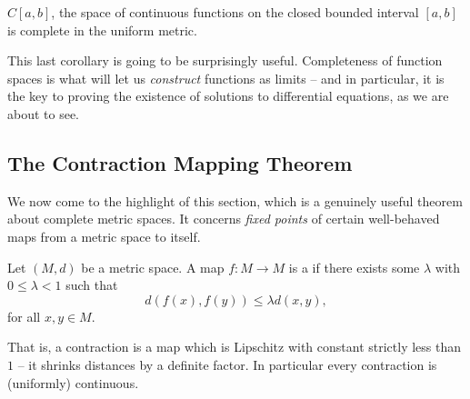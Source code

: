 \documentclass[a4paper]{scrartcl}
\begin{document}
\begin{corollary}
    $C[a, b]$, the space of continuous functions on the closed bounded interval $[a, b]$ is complete in the uniform metric.
\end{corollary}

This last corollary is going to be surprisingly useful. Completeness of function spaces is what will let us \emph{construct} functions as limits -- and in particular, it is the key to proving the existence of solutions to differential equations, as we are about to see.

\subsection{The Contraction Mapping Theorem}

We now come to the highlight of this section, which is a genuinely useful theorem about complete metric spaces. It concerns \emph{fixed points} of certain well-behaved maps from a metric space to itself.

\begin{definition}[Contraction]
    Let $(M, d)$ be a metric space. A map $f : M \rightarrow M$ is a  if there exists some $\lambda$ with $0 \leq \lambda < 1$ such that
    $$
    d(f(x), f(y)) \leq \lambda d(x, y),
    $$
    for all $x, y \in M$.
\end{definition}

That is, a contraction is a map which is Lipschitz with constant strictly less than $1$ -- it shrinks distances by a definite factor. In particular every contraction is (uniformly) continuous.
\end{document}
